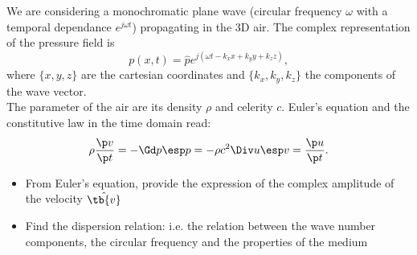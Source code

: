 
\bexo
 We are considering a monochromatic plane wave (circular frequency $\omega$ with a temporal dependance $e^{j\omega t}$) propagating in the 3D air. The complex representation of the pressure field is 
$$
p(x,t)=\hat{p}e^{j(\omega t-k_x x+k_y y +k_zz)},
$$
where $\{x,y,z\}$ are the cartesian coordinates and $\{k_x,k_y,k_z\}$ the components of the wave vector.\\

The parameter of the air are its density $\rho$ and celerity $c$. Euler's equation and the constitutive law in the time domain read:
$$ 
\rho \dfrac{\p v}{\p t}=-\Gd p \esp p=-\rho c^2 \Div u \esp v=\dfrac{\p u}{\p t}.
$$
 

\begin{itemize}
\item From Euler's equation, provide the expression of the complex amplitude of the velocity $\hat{\tb{v}}$
\item Find the dispersion relation: i.e. the relation between the wave number components, the circular frequency and the properties of the medium 
\end{itemize} 
\eexo

